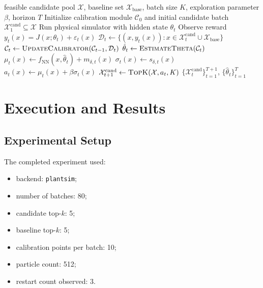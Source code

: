 \documentclass[11pt]{article}
\begin{document}
\begin{algorithm}[t]
\caption{Synchronized Digital-Twin Optimization via Continuous Calibration and UCB}
\label{alg:sync_ucb}
\begin{algorithmic}[1]
\Require feasible candidate pool $\mathcal{X}$, baseline set $\mathcal{X}_{\mathrm{base}}$, batch size $K$, exploration parameter $\beta$, horizon $T$
\State Initialize calibration module $\mathcal{C}_0$ and initial candidate batch $\mathcal{X}^{\mathrm{cand}}_1 \subseteq \mathcal{X}$
        \State Run physical simulator with hidden state $\theta_t$
        \State Observe reward $y_t(x)=J(x;\theta_t)+\varepsilon_t(x)$
    \EndFor
    \State $\mathcal{D}_t \gets \{(x,y_t(x)) : x \in \mathcal{X}^{\mathrm{cand}}_t \cup \mathcal{X}_{\mathrm{base}}\}$
    \State $\mathcal{C}_t \gets \textsc{UpdateCalibrator}(\mathcal{C}_{t-1},\mathcal{D}_t)$
    \State $\hat{\theta}_t \gets \textsc{EstimateTheta}(\mathcal{C}_t)$
        \State $\mu_t(x) \gets f_{\mathrm{NN}}(x,\hat{\theta}_t) + m_{\delta,t}(x)$
        \State $\sigma_t(x) \gets s_{\delta,t}(x)$
        \State $a_t(x) \gets \mu_t(x) + \beta \sigma_t(x)$
    \EndFor
    \State $\mathcal{X}^{\mathrm{cand}}_{t+1} \gets \textsc{TopK}(\mathcal{X}, a_t, K)$
\EndFor
\State \Return $\{\mathcal{X}^{\mathrm{cand}}_t\}_{t=1}^{T+1}$, $\{\hat{\theta}_t\}_{t=1}^T$
\end{algorithmic}
\end{algorithm}

\section{Execution and Results}
\subsection{Experimental Setup}
The completed experiment used:
\begin{itemize}[leftmargin=1.5em]
    \item backend: \texttt{plantsim};
    \item number of batches: 80;
    \item candidate top-$k$: 5;
    \item baseline top-$k$: 5;
    \item calibration points per batch: 10;
    \item particle count: 512;
    \item restart count observed: 3.
\end{itemize}
\end{document}

